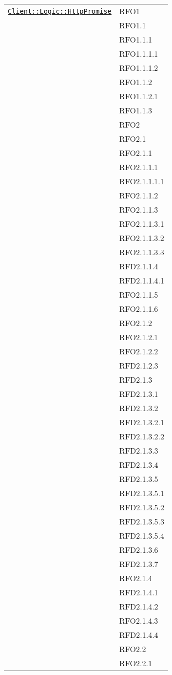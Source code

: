 \begin{longtable}{|>{\centering}m{10cm}|m{3cm}<{\centering}|}
\hyperref[Client::Logic::HttpPromise]{\texttt{Client::Logic::HttpPromise}} & RFO1\\
& RFO1.1\\
& RFO1.1.1\\
& RFO1.1.1.1\\
& RFO1.1.1.2\\
& RFO1.1.2\\
& RFO1.1.2.1\\
& RFO1.1.3\\
& RFO2\\
& RFO2.1\\
& RFO2.1.1\\
& RFO2.1.1.1\\
& RFO2.1.1.1.1\\
& RFO2.1.1.2\\
& RFO2.1.1.3\\
& RFO2.1.1.3.1\\
& RFO2.1.1.3.2\\
& RFO2.1.1.3.3\\
& RFD2.1.1.4\\
& RFD2.1.1.4.1\\
& RFO2.1.1.5\\
& RFO2.1.1.6\\
& RFO2.1.2\\
& RFO2.1.2.1\\
& RFO2.1.2.2\\
& RFD2.1.2.3\\
& RFD2.1.3\\
& RFD2.1.3.1\\
& RFD2.1.3.2\\
& RFD2.1.3.2.1\\
& RFD2.1.3.2.2\\
& RFD2.1.3.3\\
& RFD2.1.3.4\\
& RFD2.1.3.5\\
& RFD2.1.3.5.1\\
& RFD2.1.3.5.2\\
& RFD2.1.3.5.3\\
& RFD2.1.3.5.4\\
& RFD2.1.3.6\\
& RFD2.1.3.7\\
& RFO2.1.4\\
& RFD2.1.4.1\\
& RFD2.1.4.2\\
& RFO2.1.4.3\\
& RFD2.1.4.4\\
& RFO2.2\\
& RFO2.2.1\\

\end{longtable}
